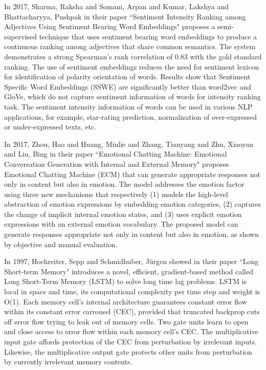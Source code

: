 In 2017, Sharma, Raksha and Somani, Arpan and Kumar, Lakshya and Bhattacharyya, Pushpak in their paper ``Sentiment Intensity Ranking among Adjectives Using Sentiment Bearing Word Embeddings" proposes a semi-supervised technique that uses sentiment bearing word embeddings to produce a continuous ranking among adjectives that share common semantics. The system demonstrates a strong Spearman's rank correlation of 0.83 with the gold standard ranking. The use of sentiment embeddings reduces the need for sentiment lexicon for identification of polarity orientation of words. Results show that Sentiment Specific Word Embeddings (SSWE) are significantly better than word2vec and GloVe, which do not capture sentiment information of words for intensity ranking task. The sentiment intensity information of words can be used in various NLP applications, for example, star-rating prediction, normalization of over-expressed or under-expressed texts, etc\cite{article7}.
\vspace{1\baselineskip}

In 2017, Zhou, Hao and Huang, Minlie and Zhang, Tianyang and Zhu, Xiaoyan and Liu, Bing in their paper ``Emotional Chatting Machine: Emotional Conversation Generation with Internal and External Memory" proposes Emotional Chatting Machine (ECM) that can generate appropriate responses not only in content but also in emotion. The model addresses the emotion factor using three new mechanisms that respectively (1) models the high-level abstraction of emotion expressions by embedding emotion categories, (2) captures the change of implicit internal emotion states, and (3) uses explicit emotion expressions with an external emotion vocabulary. The proposed model can generate responses appropriate not only in content but also in emotion, as shown by objective and manual evaluation\cite{article6}.
\vspace{1\baselineskip}

In 1997, Hochreiter, Sepp and Schmidhuber, Jürgen showed in their paper ``Long Short-term Memory" introduces a novel, efficient, gradient-based method called Long Short-Term Memory (LSTM) to solve long time lag problems. LSTM is local in space and time, its computational complexity per time step and weight is O(1). Each memory cell's internal architecture guarantees constant error flow within its constant error carrousel (CEC), provided that truncated backprop cuts off error flow trying to leak out of memory cells. Two gate units learn to open and close access to error flow within each memory cell's CEC. The multiplicative input gate affords protection of the CEC from perturbation by irrelevant inputs. Likewise, the multiplicative output gate protects other units from perturbation by currently irrelevant memory contents\cite{article}.
\vspace{1\baselineskip}

